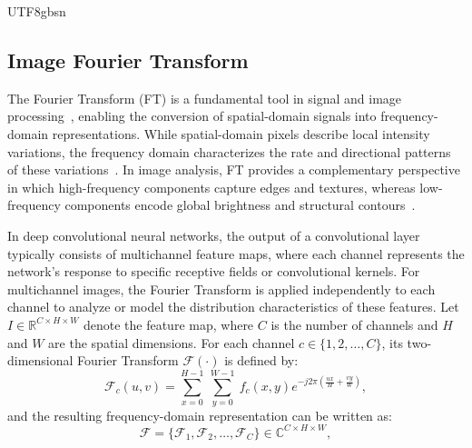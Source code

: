 \documentclass[times, review, 10pt]{elsarticle}
\begin{document}
\begin{CJK}{UTF8}{gbsn}
\subsection{Image Fourier Transform}
The Fourier Transform (FT) is a fundamental tool in signal and image processing~\cite{ref38}, enabling the conversion of spatial-domain signals into frequency-domain representations. While spatial-domain pixels describe local intensity variations, the frequency domain characterizes the rate and directional patterns of these variations~\cite{ref41}. In image analysis, FT provides a complementary perspective in which high-frequency components capture edges and textures, whereas low-frequency components encode global brightness and structural contours~\cite{ref39}.
\par
In deep convolutional neural networks, the output of a convolutional layer typically consists of multichannel feature maps, where each channel represents the network’s response to specific receptive fields or convolutional kernels. For multichannel images, the Fourier Transform is applied independently to each channel to analyze or model the distribution characteristics of these features. Let $I \in \mathbb{R}^{C \times H \times W}$ denote the feature map, where $C$ is the number of channels and $ H $ and $ W $ are the spatial dimensions. For each channel $ c \in \{1, 2, \ldots, C\} $, its two-dimensional Fourier Transform $ \mathcal{F}(\cdot) $ is defined by:
\begin{equation}
\mathcal{F}_c(u,v)=\sum_{x=0}^{H-1}\ \sum_{y=0}^{W-1}\ f_c(x,y)e^{-j2\pi(\frac{ux}{H}+\frac{vy}{W})},
\end{equation}
and the resulting frequency-domain representation can be written as:
\begin{equation}
\mathcal{F}=\{\mathcal{F}_1,\mathcal{F}_2,\ldots,\mathcal{F}_C\}\in\mathbb{C}^{C\times H\times W},

\end{equation}
\end{CJK}
\end{document}
